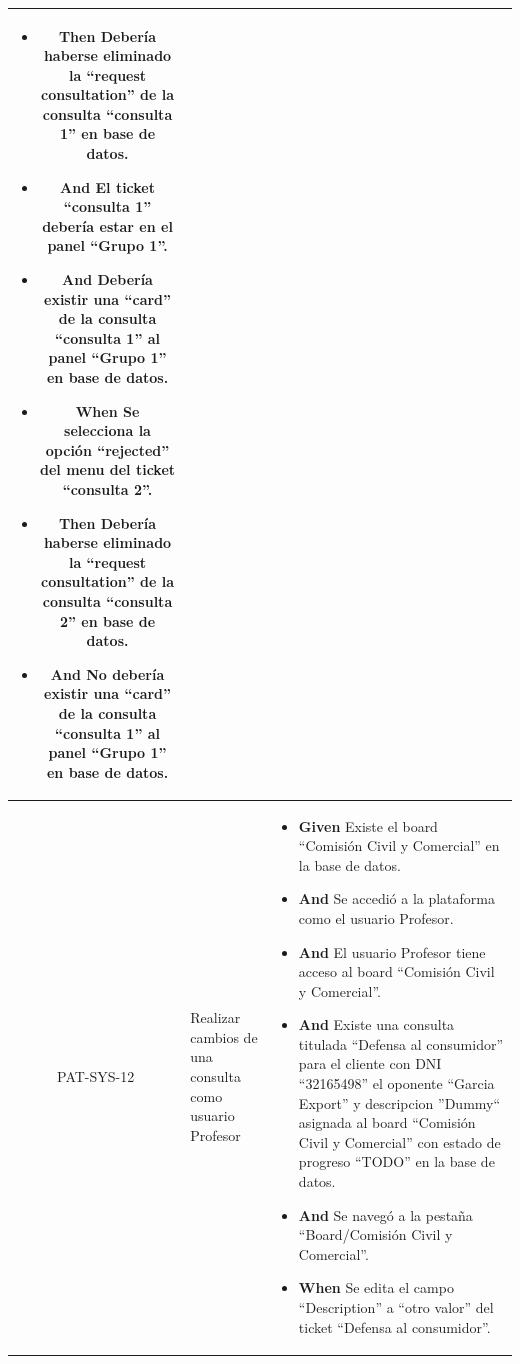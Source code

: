 \begin{longtable}{|c|p{2.5cm}|p{10.5cm}|}
\begin{itemize}
        \item \textbf{Then} Debería haberse eliminado la ``request consultation'' de la consulta ``consulta 1'' en base de datos.
        \item \textbf{And} El ticket ``consulta 1'' debería estar en el panel ``Grupo 1''.
        \item \textbf{And} Debería existir una ``card'' de la consulta ``consulta 1'' al panel ``Grupo 1'' en base de datos.
        \newline
        
        \item \textbf{When} Se selecciona la opción ``rejected'' del menu del ticket ``consulta 2''.
        \newline

        \item \textbf{Then} Debería haberse eliminado la ``request consultation'' de la consulta ``consulta 2'' en base de datos.
        \item \textbf{And} No debería existir una ``card'' de la consulta ``consulta 1'' al panel ``Grupo 1'' en base de datos.
        \newline
    \end{itemize}
    \\
    \hline
     PAT-SYS-12 & Realizar cambios de una consulta como usuario Profesor & 
        \begin{itemize}
        \item \textbf{Given} Existe el board ``Comisión Civil y Comercial'' en la base de datos.
        \item \textbf{And} Se accedió a la plataforma como el usuario Profesor.
        \item \textbf{And} El usuario Profesor tiene acceso al board ``Comisión Civil y Comercial''.
        \item \textbf{And} Existe una consulta titulada ``Defensa al consumidor'' para el cliente con DNI ``32165498'' el oponente ``Garcia Export'' y descripcion ''Dummy`` asignada al board ``Comisión Civil y Comercial'' con estado de progreso ``TODO'' en la base de datos.
        \item \textbf{And} Se navegó a la pestaña ``Board/Comisión Civil y Comercial''.
        \newline
    
        \item \textbf{When} Se edita el campo ``Description'' a ``otro valor'' del ticket ``Defensa al consumidor''.
        \newline
    

\end{itemize}
\end{longtable}
